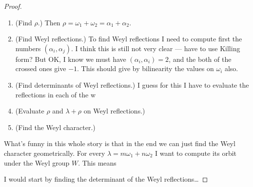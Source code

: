 \begin{proof}
\begin{enumerate}
\item (Find $\rho$.) Then $\rho=\omega_1+\omega_2=\alpha_1+\alpha_2$.

\item (Find Weyl reflections.) To find Weyl reflections I need to compute
first the numbers $(\alpha_i, \alpha_j)$. I think this is still not
very clear --- have to use Killing form? But OK, I know we must have
$(\alpha_i,\alpha_i)=2$, and the both of the crossed ones give $-1$.
This should give by bilinearity the values on $\omega_i$ also.

\item (Find determinants of Weyl reflections.) I guess for this
I have to evaluate the reflections in each of the w

\item (Evaluate $\rho$ and $\lambda+\rho$ on Weyl reflections.)

\item (Find the Weyl character.)
\end{enumerate}

What's funny in this whole story is that
in the end we can just find the Weyl character geometrically.
For every $\lambda=m \omega_1+n \omega_2$
I want to compute its orbit under the Weyl group $W$.
This means 


I would start by finding the determinant 
of the Weyl reflections…
\end{proof}





